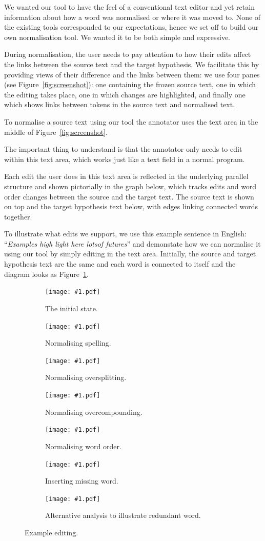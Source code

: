 \documentclass[10pt, a4paper]{article}
\begin{document}
We wanted our tool to have the feel of a conventional text editor and yet retain
information about how a word was normalised or where it was moved to. None of
the existing tools corresponded to our expectations, hence we set off to build
our own normalisation tool. We wanted it to be both simple and expressive.

During normalisation, the user needs to pay attention to how their edits affect
the links between the source text and the target hypothesis. We facilitate
this by providing views of their difference and the links between them:
we use four panes (see Figure~\ref{fig:screenshot}): one containing the
frozen source text, one in which the editing takes place, one in which
changes are highlighted, and finally one which shows links between tokens in the source text and normalised text.

To normalise a source text using our tool the annotator uses
the text area in the middle of Figure~\ref{fig:screenshot}.

The important thing to understand is that the annotator only needs to edit
within this text area, which works just like a text field in a normal program.

Each edit the user does in this text area is reflected in the underlying
parallel structure and shown pictorially in the graph below, which tracks
edits and word order changes between the source and the target text.
The source text is shown on top and the target hypothesis text below, with
edges linking connected words together.

To illustrate what edits we support, we use this example sentence in English:
``\emph{Examples high light here lotsof futures}''
and demonstate how we can normalise it using our tool by simply editing in
the text area.  Initially, the source and target hypothesis text are
the same and each word is connected to itself and the diagram looks as
Figure~\ref{fig:features0}.

\begin{figure}
\centering
\newcommand{\features}[2]{
\begin{subfigure}[t]{0.5\textwidth}
\texttt{[image: \#1.pdf]}
\caption{#2 \label{fig:#1}}
\end{subfigure}
}

\features{features0}{The initial state.}
\features{features1}{Normalising spelling.}
\features{features2}{Normalising oversplitting.}
\features{features3}{Normalising overcompounding.}
\features{features4}{Normalising word order.}
\features{features5}{Inserting missing word.}
\features{features6}{Alternative analysis to illustrate redundant word.}
\caption{Example editing.}
\end{figure}
\end{document}
